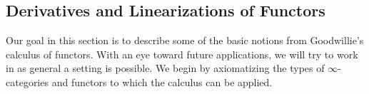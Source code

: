 
\subsection{Derivatives and Linearizations of Functors}\label{linf}\label{bisec5.1}

Our goal in this section is to describe some of the basic notions from
Goodwillie's calculus of functors. With an eye toward future applications, we will try to work
in as general a setting is possible. We begin by axiomatizing the types of
$\infty$-categories and functors to which the calculus can be applied.

